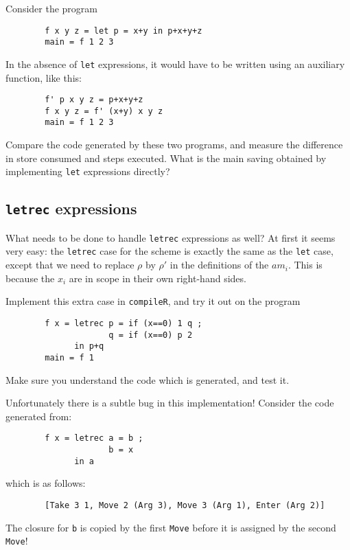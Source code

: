 \begin{exercise}
Consider the program
\begin{verbatim}
        f x y z = let p = x+y in p+x+y+z
        main = f 1 2 3
\end{verbatim}
In the absence of \mbox{\tt let} expressions, it would have to be written using an
auxiliary function, like this:
\begin{verbatim}
        f' p x y z = p+x+y+z
        f x y z = f' (x+y) x y z
        main = f 1 2 3
\end{verbatim}
Compare the code generated by these two programs, and measure the difference
in store consumed and steps executed.  What is the main saving obtained
by implementing \mbox{\tt let} expressions directly?
\end{exercise}

\subsection{\mbox{\tt letrec} expressions}
\label{sect:tim:letrec-expr}

What needs to be done to handle \mbox{\tt letrec} expressions as well?
At first it seems very easy: the \mbox{\tt letrec} case for the \tR{} scheme is
exactly the same as the \mbox{\tt let} case, except that we need to replace
$\rho$ by $\rho'$ in the definitions of the $am_i$.
This is because the $x_i$ are in scope in their own right-hand sides.

\begin{exercise}
Implement this extra case in \mbox{\tt compileR}, and try it out on the program
\begin{verbatim}
        f x = letrec p = if (x==0) 1 q ;
                     q = if (x==0) p 2
              in p+q
        main = f 1
\end{verbatim}
Make sure you understand the code which is generated, and test it.
\end{exercise}

Unfortunately there is a subtle bug in this implementation!
Consider the code generated from:
\begin{verbatim}
        f x = letrec a = b ;
                     b = x
              in a
\end{verbatim}
which is as follows:
\begin{verbatim}
        [Take 3 1, Move 2 (Arg 3), Move 3 (Arg 1), Enter (Arg 2)]
\end{verbatim}
The closure for \mbox{\tt b} is copied by the first \mbox{\tt Move} before it is
assigned by the second \mbox{\tt Move}!

